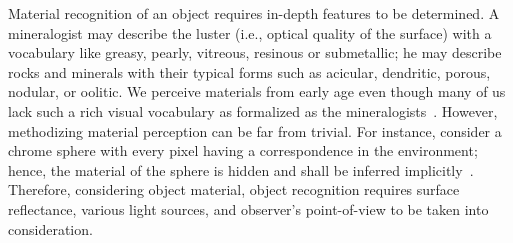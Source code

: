 Material recognition of an object requires in-depth features to be determined. A mineralogist may describe the luster (i.e., optical quality of the surface) with a vocabulary like greasy, pearly, vitreous, resinous or submetallic; he may describe rocks and minerals with their typical forms such as acicular, dendritic, porous, nodular, or oolitic. We perceive materials from early age even though many of us lack such a rich visual vocabulary as formalized as the mineralogists~\cite{adelson2001seeing}. However, methodizing material perception can be far from trivial. For instance, consider a chrome sphere with every pixel having a correspondence in the environment; hence, the material of the sphere is hidden and shall be inferred implicitly~\cite{shafer2000color,adelson2001seeing}. Therefore, considering object material, object recognition requires surface reflectance, various light sources, and observer's point-of-view to be taken into consideration.


